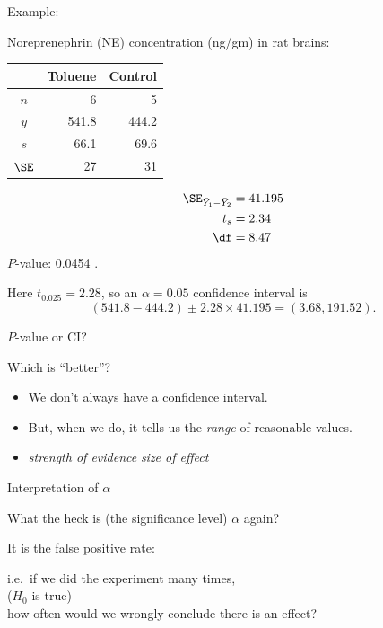 \begin{frame}{Example: }

    Noreprenephrin (NE) concentration (ng/gm) in rat brains:
    \begin{center}
      \begin{tabular}{c|rr}
            & Toluene & Control \\
          \hline
          $n$ & 6 & 5 \\
          $\bar y$ & 541.8 & 444.2 \\
          $s$  & 66.1 & 69.6 \\
          $\SE$ & 27 & 31 \\
     \end{tabular}
   \end{center}


     \begin{align*}
         \SE_{\bar Y_1 - \bar Y_2} &= 41.195 \\
         t_s &= 2.34  \\
         \df &= 8.47 
     \end{align*}
     $P$-value: 0.0454 .


  \vspace{2em}

  Here $t_{0.025} = 2.28$, so an $\alpha=0.05$ confidence interval is
  \[  (541.8-444.2) \pm 2.28 \times 41.195 = (3.68,191.52) . \]

\end{frame}

\begin{frame}{$P$-value or CI?}

  Which is ``better''?

  \pause
  \begin{itemize}
    \item We don't always have a confidence interval.
    \item But, when we do, it tells us the \emph{range} of reasonable values.
    \item \emph{strength of evidence}  \emph{size of effect}
  \end{itemize}

\end{frame}

\begin{frame}{Interpretation of $\alpha$}

  What the heck is (the significance level) $\alpha$ again?

  \vspace{2em}
  \pause

  It is the \alert{false positive rate}:

  \vspace{2em}
  \pause

  i.e.\ if we did the experiment many times,\\
   ($H_0$ is true)\\
  how often would we \alert{wrongly} conclude there is an effect?

\end{frame}



